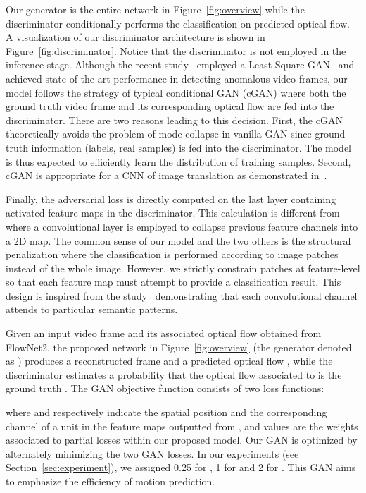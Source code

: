 \documentclass[10pt,twocolumn,letterpaper]{article}
\begin{document}
Our generator is the entire network in Figure~\ref{fig:overview} while the discriminator conditionally performs the classification on predicted optical flow. A visualization of our discriminator architecture is shown in Figure~\ref{fig:discriminator}. Notice that the discriminator is not employed in the inference stage. Although the recent study~\cite{Wen2018Future} employed a Least Square GAN~\cite{Mao2017Least} and achieved state-of-the-art performance in detecting anomalous video frames, our model follows the strategy of typical conditional GAN (cGAN) where both the ground truth video frame and its corresponding optical flow are fed into the discriminator. There are two reasons leading to this decision. First, the cGAN theoretically avoids the problem of mode collapse in vanilla GAN since ground truth information (\ie labels, real samples) is fed into the discriminator. The model is thus expected to efficiently learn the distribution of training samples. Second, cGAN is appropriate for a CNN of image translation as demonstrated in~\cite{Isola2017Image}.

Finally, the adversarial loss is directly computed on the last layer containing activated feature maps in the discriminator. This calculation is different from~\cite{Isola2017Image,Wen2018Future} where a convolutional layer is employed to collapse previous feature channels into a 2D map. The common sense of our model and the two others is the structural penalization where the classification is performed according to image patches instead of the whole image. However, we strictly constrain patches at feature-level so that each feature map must attempt to provide a classification result. This design is inspired from the study~\cite{Long2017SCA} demonstrating that each convolutional channel attends to particular semantic patterns.

Given an input video frame  and its associated optical flow  obtained from FlowNet2, the proposed network in Figure~\ref{fig:overview} (the generator denoted as ) produces a reconstructed frame  and a predicted optical flow , while the discriminator  estimates a probability that the optical flow associated to  is the ground truth . The GAN objective function consists of two loss functions:


where  and  respectively indicate the spatial position and the corresponding channel of a unit in the feature maps outputted from , and  values are the weights associated to partial losses within our proposed model. Our GAN is optimized by alternately minimizing the two GAN losses. In our experiments (see Section~\ref{sec:experiment}), we assigned 0.25 for , 1 for  and 2 for . This GAN aims to emphasize the efficiency of motion prediction.
\end{document}

